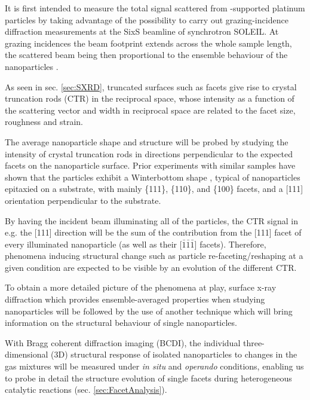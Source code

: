 It is first intended to measure the total signal scattered from -supported platinum particles by taking advantage of the possibility to carry out grazing-incidence diffraction measurements at the SixS beamline of synchrotron SOLEIL.
At grazing incidences the beam footprint extends across the whole sample length, the scattered beam being then proportional to the ensemble behaviour of the nanoparticles \parencite{Nolte2008, Hejral2013, Hejral2016}.

As seen in sec. \ref{sec:SXRD}, truncated surfaces such as facets give rise to crystal truncation rods (CTR) in the reciprocal space, whose intensity as a function of the scattering vector and width in reciprocal space are related to the facet size, roughness and strain.

The average nanoparticle shape and structure will be probed by studying the intensity of crystal truncation rods in directions perpendicular to the expected facets on the nanoparticle surface.
Prior experiments with similar samples \parencite{Dupraz2017, Li2020, Lim2021, Dupraz2022} have shown that the particles exhibit a Winterbottom shape \parencite{Winterbottom1967, Boukouvala2021}, typical of nanoparticles epitaxied on a substrate, with mainly \{111\}, \{110\}, and \{100\} facets, and a [111] orientation perpendicular to the substrate.

By having the incident beam illuminating all of the particles, the CTR signal in e.g. the [111] direction will be the sum of the contribution from the [111] facet of every illuminated nanoparticle (as well as their [$\bar{1}\bar{1}\bar{1}$] facets).
Therefore, phenomena inducing structural change such as particle re-faceting/reshaping at a given condition are expected to be visible by an evolution of the different CTR.

To obtain a more detailed picture of the phenomena at play, surface x-ray diffraction which provides ensemble-averaged properties when studying nanoparticles will be followed by the use of another technique which will bring information on the structural behaviour of single nanoparticles.

With Bragg coherent diffraction imaging (BCDI), the individual three-dimensional (3D) structural response of isolated nanoparticles to changes in the gas mixtures will be measured under \textit{in situ} and \textit{operando} conditions, enabling us to probe in detail the structure evolution of single facets during heterogeneous catalytic reactions (sec. \ref{sec:FacetAnalysis}).

